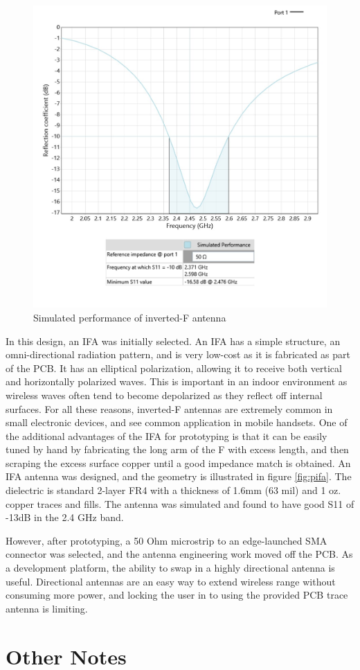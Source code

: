 \begin{figure}[h]
\centering
\includegraphics[width=0.5\linewidth]{images/antenna-performance}
\caption[IFA Performance]{Simulated performance of inverted-F antenna}
\label{fig:pifaperf}
\end{figure}

In this design, an IFA was initially selected. An IFA has a simple structure, an omni-directional radiation pattern, and is very low-cost as it is fabricated as part of the PCB. It has an elliptical polarization, allowing it to receive both vertical and horizontally polarized waves\cite{Huynh2000}. This is important in an indoor environment as wireless waves often tend to become depolarized as they reflect off internal surfaces. For all these reasons, inverted-F antennas are extremely common in small electronic devices, and see common application in mobile handsets. One of the additional advantages of the IFA for prototyping is that it can be easily tuned by hand by fabricating the long arm of the F with excess length, and then scraping the excess surface copper until a good impedance match is obtained. An IFA antenna was designed, and the geometry is illustrated in figure \ref{fig:pifa}. The dielectric is standard 2-layer FR4 with a thickness of 1.6mm (63 mil) and 1 oz. copper traces and fills. The antenna  was simulated and found to have good S11 of -13dB in the 2.4 GHz band. 

However, after prototyping, a 50 Ohm microstrip to an edge-launched SMA connector was selected, and the antenna engineering work moved off the PCB. As a development platform, the ability to swap in a highly directional antenna is useful. Directional antennas are an easy way to extend wireless range without consuming more power, and locking the user in to using the provided PCB trace antenna is limiting.

\section{Other Notes}


